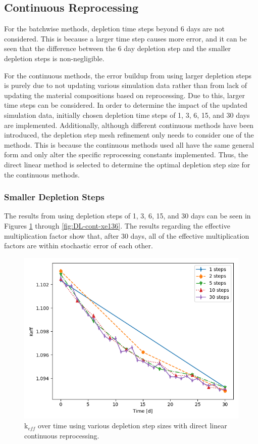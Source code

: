 \subsection{Continuous Reprocessing}

For the batchwise methods, depletion time steps beyond 6 days are not considered. This is because a larger time step causes more error, and it can be seen that the difference between the 6 day depletion step and the smaller depletion steps is non-negligible.

For the continuous methods, the error buildup from using larger depletion steps is purely due to not updating various simulation data rather than from lack of updating the material compositions based on reprocessing. Due to this, larger time steps can be considered. In order to determine the impact of the updated simulation data, initially chosen depletion time steps of 1, 3, 6, 15, and 30 days are implemented. Additionally, although different continuous methods have been introduced, the depletion step mesh refinement only needs to consider one of the methods. This is because the continuous methods used all have the same general form and only alter the specific reprocessing constants implemented. Thus, the direct linear method is selected to determine the optimal depletion step size for the continuous methods.

\subsubsection{Smaller Depletion Steps}

The results from using depletion steps of 1, 3, 6, 15, and 30 days can be seen in Figures \ref{fig:DL-cont-k} through \ref{fig:DL-cont-xe136}. The results regarding the effective multiplication factor show that, after 30 days, all of the effective multiplication factors are within stochastic error of each other. 

\begin{figure}[H]
  \centering
  \includegraphics[scale=0.5]{images/DL_NSTEP_keff.png}
  \caption{k$_{eff}$ over time using various depletion step sizes with direct linear continuous reprocessing.}
   \label{fig:DL-cont-k}
\end{figure}

